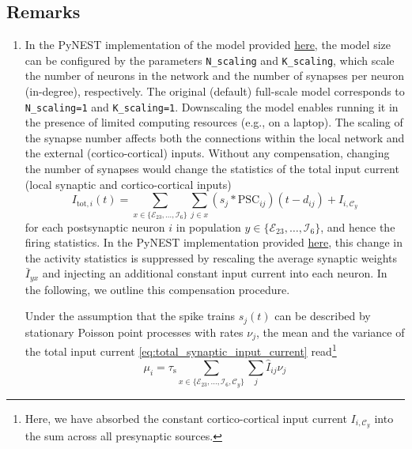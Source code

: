 \documentclass[10pt,a4paper,twoside,american]{article}
\theoremstyle{definitionstyle}
\newcommand{\tauS}{\tau_\text{s}}
\begin{document}
\begin{appendices}
\section{Remarks}
\label{sec:remarks}
\begin{enumerate}
\item \label{remark:network_scaling}
  In the PyNEST implementation of the model provided \href{https://github.com/INM-6/microcircuit-PD14-model}{here}, the model size can be configured by the parameters \texttt{N\_scaling} and \texttt{K\_scaling}, which scale the number of neurons in the network and the number of synapses per neuron (in-degree), respectively. 
  The original (default) full-scale model corresponds to \texttt{N\_scaling=1} and \texttt{K\_scaling=1}.
  Downscaling the model enables running it in the presence of limited computing resources (e.g., on a laptop).
  The scaling of the synapse number affects both the connections within the local network and the external (cortico-cortical) inputs.
  Without any compensation, changing the number of synapses would change the statistics of the total input current (local synaptic and cortico-cortical inputs)
  \begin{equation}
    \label{eq:total_synaptic_input_current}
    I_{\text{tot},i}(t)=\sum_{x\in\{\mathcal{E}_{23},\ldots,\mathcal{I}_{6}\}} \sum_{j\in{}x} (s_j* \text{PSC}_{ij})(t-d_{ij}) + I_{i,\mathcal{C}_y}
  \end{equation}
  for each postsynaptic neuron $i$ in population $y\in\{\mathcal{E}_{23},\ldots,\mathcal{I}_{6}\}$, and hence the firing statistics.
  In the PyNEST implementation provided \href{https://github.com/INM-6/microcircuit-PD14-model}{here}, this change in the activity statistics is suppressed by rescaling the average synaptic weights $\bar{I}_{yx}$ and injecting an additional constant input current into each neuron.
  In the following, we outline this compensation procedure.
  \par  
  Under the assumption that the spike trains $s_j(t)$ can be described by stationary Poisson point processes with rates $\nu_j$, the mean and the variance of the total input current \cref{eq:total_synaptic_input_current} read\footnote{Here, we have absorbed the constant cortico-cortical input current $I_{i,\mathcal{C}_y}$ into the sum across all presynaptic sources.}
  \begin{equation}
    \label{eq:mean_and_variances_synaptic_input}
      \mu_i      =             \tauS \sum_{x\in\{\mathcal{E}_{23},\ldots,\mathcal{I}_{6},\mathcal{C}_y\}} \sum_j \hat{I}_{ij}   \nu_j 

\end{equation}
\end{enumerate}
\end{appendices}
\end{document}
